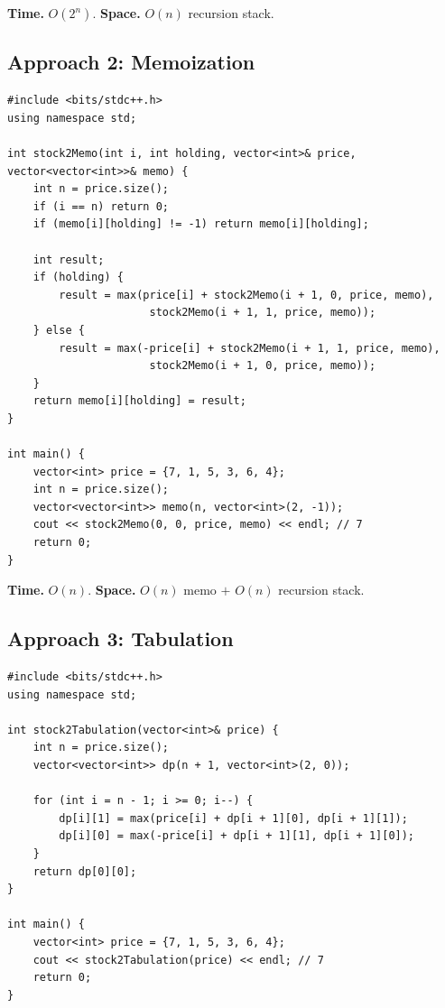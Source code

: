 \begin{complexitybox}
\textbf{Time.} $O(2^n)$.
\textbf{Space.} $O(n)$ recursion stack.
\end{complexitybox}

\subsection*{Approach 2: Memoization}

\begin{lstlisting}
#include <bits/stdc++.h>
using namespace std;

int stock2Memo(int i, int holding, vector<int>& price, vector<vector<int>>& memo) {
    int n = price.size();
    if (i == n) return 0;
    if (memo[i][holding] != -1) return memo[i][holding];

    int result;
    if (holding) {
        result = max(price[i] + stock2Memo(i + 1, 0, price, memo),
                      stock2Memo(i + 1, 1, price, memo));
    } else {
        result = max(-price[i] + stock2Memo(i + 1, 1, price, memo),
                      stock2Memo(i + 1, 0, price, memo));
    }
    return memo[i][holding] = result;
}

int main() {
    vector<int> price = {7, 1, 5, 3, 6, 4};
    int n = price.size();
    vector<vector<int>> memo(n, vector<int>(2, -1));
    cout << stock2Memo(0, 0, price, memo) << endl; // 7
    return 0;
}
\end{lstlisting}

\begin{complexitybox}
\textbf{Time.} $O(n)$.
\textbf{Space.} $O(n)$ memo $+$ $O(n)$ recursion stack.
\end{complexitybox}

\subsection*{Approach 3: Tabulation}

\begin{lstlisting}
#include <bits/stdc++.h>
using namespace std;

int stock2Tabulation(vector<int>& price) {
    int n = price.size();
    vector<vector<int>> dp(n + 1, vector<int>(2, 0));

    for (int i = n - 1; i >= 0; i--) {
        dp[i][1] = max(price[i] + dp[i + 1][0], dp[i + 1][1]);
        dp[i][0] = max(-price[i] + dp[i + 1][1], dp[i + 1][0]);
    }
    return dp[0][0];
}

int main() {
    vector<int> price = {7, 1, 5, 3, 6, 4};
    cout << stock2Tabulation(price) << endl; // 7
    return 0;
}
\end{lstlisting}

